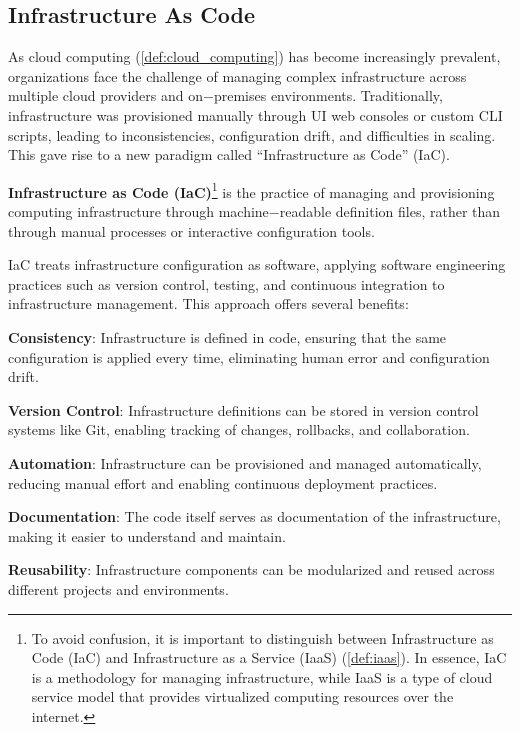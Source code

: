 
\subsection{Infrastructure As Code}

As cloud computing (\ref{def:cloud_computing}) has become increasingly prevalent, organizations face the challenge
of managing complex infrastructure across multiple cloud providers and on$-$premises environments. Traditionally,
infrastructure was provisioned manually through UI web consoles or custom CLI scripts, leading to inconsistencies,
configuration drift, and difficulties in scaling. This gave rise to a new paradigm called ``Infrastructure as
Code'' (IaC).

\textbf{Infrastructure as Code (IaC)}\footnote{To avoid confusion, it is important to distinguish between Infrastructure
as Code (IaC) and Infrastructure as a Service (IaaS) (\ref{def:iaas}). In essence, IaC is a methodology for managing
infrastructure, while IaaS is a type of cloud service model that provides virtualized computing resources over the
internet.} is the practice of managing and provisioning computing infrastructure through machine$-$readable definition
files, rather than through manual processes or interactive configuration tools.
\ed

IaC treats infrastructure configuration as software, applying software engineering practices such as version control,
testing, and continuous integration to infrastructure management. This approach offers several benefits:
\bit
\item \textbf{Consistency}: Infrastructure is defined in code, ensuring that the same configuration is applied every
time, eliminating human error and configuration drift.
\item \textbf{Version Control}: Infrastructure definitions can be stored in version control systems like Git, enabling
tracking of changes, rollbacks, and collaboration.
\item \textbf{Automation}: Infrastructure can be provisioned and managed automatically, reducing manual effort and
enabling continuous deployment practices.
\item \textbf{Documentation}: The code itself serves as documentation of the infrastructure, making it easier to
understand and maintain.
\item \textbf{Reusability}: Infrastructure components can be modularized and reused across different projects and
environments.
\eit

